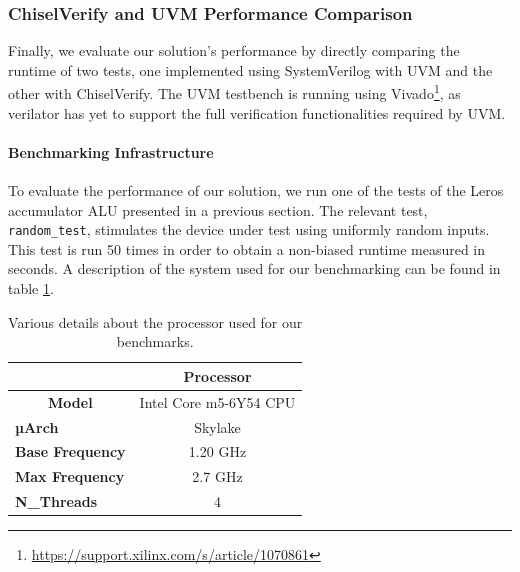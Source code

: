 \documentclass[conference]{IEEEtran}
\newcommand{\todo}[1]{{\color{olive} TODO: #1}}
\begin{document}
\subsubsection{ChiselVerify and UVM Performance Comparison}
Finally, we evaluate our solution's performance by directly comparing the runtime of two tests, one implemented using SystemVerilog with UVM and the other with ChiselVerify. 
The UVM testbench is running using Vivado\footnote{\url{https://support.xilinx.com/s/article/1070861}}, as verilator has yet to support the full verification functionalities required by UVM.

\paragraph{Benchmarking Infrastructure}
To evaluate the performance of our solution, we run one of the tests of the Leros accumulator ALU presented in a previous section.
The relevant test, \texttt{random\_test}, stimulates the device under test using uniformly random inputs.
This test is run 50 times in order to obtain a non-biased runtime measured in seconds. 
A description of the system used for our benchmarking can be found in table \ref{tab:processorinfo}.
\begin{table}[h]
\centering
\begin{tabular}{|l|c|}
\hline
\multicolumn{1}{|c|}{\textbf{}}      & \textbf{Processor}     \\ \hline
\multicolumn{1}{|c|}{\textbf{Model}} & Intel Core m5-6Y54 CPU \\ \hline
\textbf{µArch}                       & Skylake                \\ \hline
\textbf{Base Frequency}              & 1.20 GHz               \\ \hline
\textbf{Max Frequency}               & 2.7 GHz                \\ \hline
\textbf{N\_Threads}                  & 4                      \\ \hline
\end{tabular}
\caption{Various details about the processor used for our benchmarks.}
\label{tab:processorinfo}
\end{table}
\end{document}
